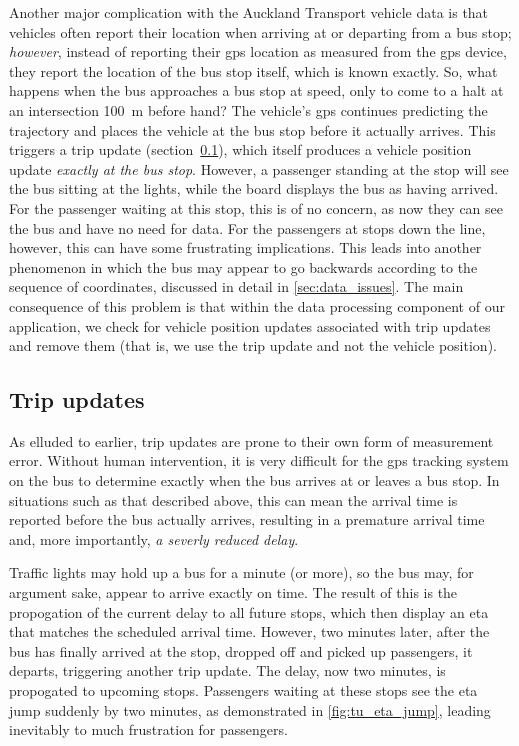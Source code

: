 Another major complication with the Auckland Transport vehicle data is that vehicles often report their location when arriving at or departing from a bus stop; \emph{however}, instead of reporting their \gls{gps} location as measured from the \gls{gps} device, they report the location of the bus stop itself, which is known exactly. So, what happens when the bus approaches a bus stop at speed, only to come to a halt at an intersection 100~m before hand? The vehicle's \gls{gps} continues predicting the trajectory and places the vehicle at the bus stop before it actually arrives. This triggers a trip update (section~\ref{sec:tu_data}), which itself produces a vehicle position update \emph{exactly at the bus stop}. However, a passenger standing at the stop will see the bus sitting at the lights, while the \rt{} board displays the bus as having arrived. For the passenger waiting at this stop, this is of no concern, as now they can see the bus and have no need for \rt{} data. For the passengers at stops down the line, however, this can have some frustrating implications. This leads into another phenomenon in which the bus may appear to go backwards according to the sequence of \gps{} coordinates, discussed in detail in \cref{sec:data_issues}. The main consequence of this problem is that within the data processing component of our application, we check for vehicle position updates associated with trip updates and remove them (that is, we use the trip update and not the vehicle position).




\subsection{Trip updates}
\label{sec:tu_data}

As elluded to earlier, trip updates are prone to their own form of measurement error. Without human intervention, it is very difficult for the \gls{gps} tracking system on the bus to determine exactly when the bus arrives at or leaves a bus stop. In situations such as that described above, this can mean the arrival time is reported before the bus actually arrives, resulting in a premature arrival time and, more importantly, \emph{a severly reduced delay}.


Traffic lights may hold up a bus for a minute (or more), so the bus may, for argument sake, appear to arrive exactly on time. The result of this is the propogation of the current delay to all future stops, which then display an \gls{eta} that matches the scheduled arrival time. However, two minutes later, after the bus has finally arrived at the stop, dropped off and picked up passengers, it departs, triggering another trip update. The delay, now two minutes, is propogated to upcoming stops. Passengers waiting at these stops see the \gls{eta} jump suddenly by two minutes, as demonstrated in \cref{fig:tu_eta_jump}, leading inevitably to much frustration for passengers.


